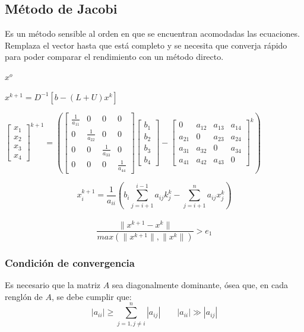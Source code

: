 \subsection{M\'etodo de Jacobi}
Es un m\'etodo sensible al orden en que se encuentran acomodadas las ecuaciones. Remplaza el vector hasta que est\'a completo y se necesita que converja r\'apido para poder comparar el rendimiento con un m\'etodo directo.
\begin{center}
$x^o$ \end{center}
\begin{center}$x^{k+1}=D^{-1}[b-(L+U)x^k]$\end{center}
\begin{center}$\begin{bmatrix}
x_1 \\ x_2 \\ x_3 \\ x_4 
\end{bmatrix}^{k+1}=\left(\begin{bmatrix}
\frac{1}{a_{11}} & 0 & 0 & 0 \\
0 & \frac{1}{a_{22}} & 0 & 0 \\
0 & 0 & \frac{1}{a_{33}} & 0 \\
0 & 0 & 0 & \frac{1}{a_{44}}
\end{bmatrix}\begin{bmatrix}
b_1 \\ b_2 \\ b_3 \\ b_4
\end{bmatrix}-\begin{bmatrix}
0 & a_{12} & a_{13} & a_{14} \\
a_{21} & 0 & a_{23} & a_{24} \\
a_{31} & a_{32} & 0 & a_{34} \\
a_{41} & a_{42} & a_{43} & 0
\end{bmatrix}^k\right)$
\end{center}
\begin{displaymath}
x_i^{k+1}=\frac{1}{a_{ii}}(b_i\sum_{j=i+1}^{i-1}a_{ij}k_j^k-\sum _{j=i+1}^na_{ij}x_j^k)
\end{displaymath}
\\
\begin{displaymath}
\frac{\parallel x^{k+1}-x^k \parallel}{max(\parallel x^{k+1} \parallel, \parallel x^k \parallel)}>e_1
\end{displaymath}
\subsubsection*{Condici\'on de convergencia}
Es necesario que la matriz $A$ sea diagonalmente dominante, \'osea que, en cada rengl\'on de $A$, se debe cumplir que: 
\begin{displaymath}
|a_{ii}|\geq \sum_{j=1,j\neq i}^n |a_{ij}| \qquad |a_{ii}|\gg |a_{ij}|
\end{displaymath}

